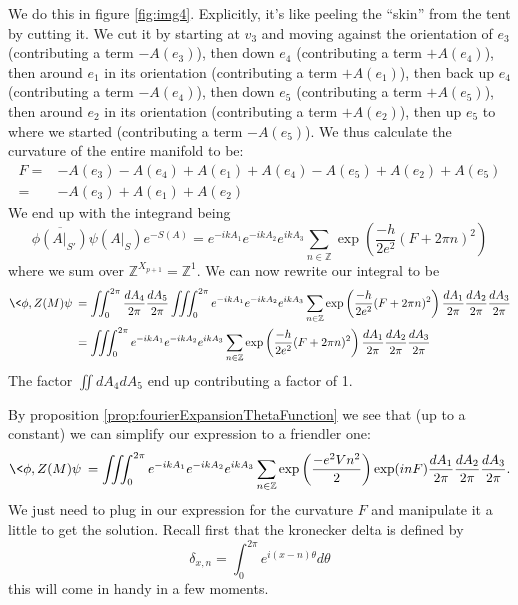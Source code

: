 We do this in figure \ref{fig:img4}. Explicitly, it's like 
peeling the ``skin'' from the tent by cutting it. We cut it by
starting at $v_{3}$ and moving against the orientation of $e_{3}$
(contributing a term $-A(e_{3})$), then down $e_{4}$
(contributing a term $+A(e_{4})$), then around $e_{1}$ in its
orientation (contributing a term $+A(e_{1})$), then back up
$e_{4}$ (contributing a term $-A(e_{4})$), then down $e_{5}$
(contributing a term $+A(e_{5})$), then around $e_{2}$ in its
orientation (contributing a term $+A(e_{2})$), then up $e_{5}$ to
where we started (contributing a term $-A(e_{5})$). We thus calculate
the curvature of the entire manifold to be:
\begin{equation}%
\begin{split}
F =&
-A(e_{3})-A(e_{4})+A(e_{1})+A(e_{4})-A(e_{5})+A(e_{2})+A(e_{5}) \\
=& -A(e_{3})+A(e_{1})+A(e_{2})
\end{split}
\end{equation}
We end up with the integrand being
\begin{equation}%
\overline{\phi(A|_{S'})}\psi(A|_{S}) e^{-S(A)}=e^{-ikA_{1}}e^{-ikA_{2}}e^{ikA_{3}}\sum_{n\in\mathbb{Z}}\exp\left(\frac{-h}{2e^{2}}(F+2\pi n)^{2}\right)
\end{equation}
where we sum over $\mathbb{Z}^{X_{p+1}}=\mathbb{Z}^{1}$. We can
now rewrite our integral to be
\begin{equation}%
\begin{split}
\<\phi,Z(M)\psi\> &=
\iint^{2\pi}_{0}\frac{dA_{4}}{2\pi}\frac{dA_{5}}{2\pi}
\iiint^{2\pi}_{0}e^{-ikA_{1}}e^{-ikA_{2}}e^{ikA_{3}}\sum_{n\in\mathbb{Z}}\exp\left(\frac{-h}{2e^{2}}(F+2\pi n)^{2}\right)\frac{dA_{1}}{2\pi}\frac{dA_{2}}{2\pi}\frac{dA_{3}}{2\pi}\\
&= \iiint^{2\pi}_{0}e^{-ikA_{1}}e^{-ikA_{2}}e^{ikA_{3}}\sum_{n\in\mathbb{Z}}\exp\left(\frac{-h}{2e^{2}}(F+2\pi n)^{2}\right)\frac{dA_{1}}{2\pi}\frac{dA_{2}}{2\pi}\frac{dA_{3}}{2\pi}
\end{split}
\end{equation}
The factor $\iint dA_{4}dA_{5}$ end up contributing a factor
of 1. 

By proposition \eqref{prop:fourierExpansionThetaFunction} we see
that (up to a constant) we can simplify our expression to a
friendler one:
\begin{equation}%
\<\phi,Z(M)\psi\> = \iiint^{2\pi}_{0}e^{-ikA_{1}}e^{-ikA_{2}}e^{ikA_{3}}\sum_{n\in\mathbb{Z}}\exp\left(\frac{-e^{2}Vn^{2}}{2}\right)\exp(inF)\frac{dA_{1}}{2\pi}\frac{dA_{2}}{2\pi}\frac{dA_{3}}{2\pi}.
\end{equation}
We just need to plug in our expression for the curvature $F$ and
manipulate it a little to get the solution. Recall first that the
kronecker delta is defined by
\begin{equation}%
\delta_{x,n} = \int^{2\pi}_{0} e^{i(x-n)\theta}d\theta
\end{equation}
this will come in handy in a few moments.


